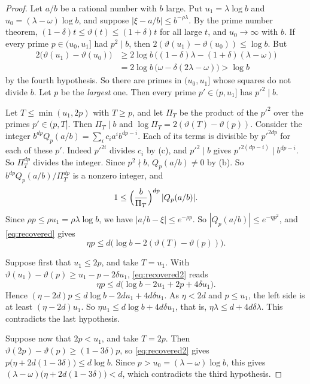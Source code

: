 \documentclass[11pt]{amsart}
\theoremstyle{definition}
\theoremstyle{remark}
\numberwithin{equation}{section}
\begin{document}
\begin{proof}
Let $a/b$ be a rational number with $b$ large. Put $u_1=\lambda\log b$ and $u_0=(\lambda-\omega)\log b$,
and suppose $|\xi-a/b|\le b^{-\rho\lambda}$. By the prime number theorem,
$(1-\delta)t\le\vartheta(t)\le(1+\delta)t$ for all large $t$, and $u_0\to\infty$ with $b$. If every prime
$p\in(u_0,u_1]$ had $p^2\mid b$, then $2(\vartheta(u_1)-\vartheta(u_0))\le\log b$. But
\begin{align*}
 2\bigl(\vartheta(u_1)-\vartheta(u_0)\bigr)&\ge2\log b\,\bigl((1-\delta)\lambda-(1+\delta)(\lambda-\omega)\bigr)\\
 &=2\log b\,\bigl(\omega-\delta(2\lambda-\omega)\bigr)>\log b
\end{align*}
by the fourth hypothesis. So there are primes in $(u_0,u_1]$ whose squares do not divide $b$. Let $p$ be
the \emph{largest} one. Then every prime $p'\in(p,u_1]$ has $p'^2\mid b$.

Let $T\le\min(u_1,2p)$ with $T\ge p$, and let $\Pi_T$ be the product of the $p'^2$ over the primes
$p'\in(p,T]$. Then $\Pi_T\mid b$ and $\log\Pi_T=2(\vartheta(T)-\vartheta(p))$. Consider the integer
$b^{dp}Q_p(a/b)=\sum_ic_ia^ib^{dp-i}$. Each of its terms is divisible by $p'^{2dp}$ for each of these $p'$.
Indeed $p'^{2i}$ divides $c_i$ by (c), and $p'^2\mid b$ gives $p'^{2(dp-i)}\mid b^{dp-i}$. So $\Pi_T^{dp}$
divides the integer. Since $p^2\nmid b$, $Q_p(a/b)\ne0$ by (b). So $b^{dp}Q_p(a/b)/\Pi_T^{dp}$ is a nonzero
integer, and
\begin{equation}\label{eq:recovered}
 1\le\Bigl(\frac b{\Pi_T}\Bigr)^{dp}\,|Q_p(a/b)| .
\end{equation}
Since $\rho p\le\rho u_1=\rho\lambda\log b$, we have $|a/b-\xi|\le e^{-\rho p}$. So
$|Q_p(a/b)|\le e^{-\eta p^2}$, and \eqref{eq:recovered} gives
\begin{equation}\label{eq:recovered2}
 \eta p\le d\bigl(\log b-2(\vartheta(T)-\vartheta(p))\bigr).
\end{equation}

Suppose first that $u_1\le2p$, and take $T=u_1$. With
$\vartheta(u_1)-\vartheta(p)\ge u_1-p-2\delta u_1$, \eqref{eq:recovered2} reads
\[
 \eta p\le d\bigl(\log b-2u_1+2p+4\delta u_1\bigr).
\]
Hence $(\eta-2d)p\le d\log b-2du_1+4d\delta u_1$. As $\eta<2d$ and $p\le u_1$, the left side is at least
$(\eta-2d)u_1$. So $\eta u_1\le d\log b+4d\delta u_1$, that is, $\eta\lambda\le d+4d\delta\lambda$. This
contradicts the last hypothesis.

Suppose now that $2p<u_1$, and take $T=2p$. Then $\vartheta(2p)-\vartheta(p)\ge(1-3\delta)p$, so
\eqref{eq:recovered2} gives $p\bigl(\eta+2d(1-3\delta)\bigr)\le d\log b$. Since $p>u_0=(\lambda-\omega)\log b$,
this gives $(\lambda-\omega)\bigl(\eta+2d(1-3\delta)\bigr)<d$, which contradicts the third hypothesis.
\end{proof}
\end{document}

